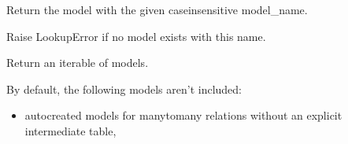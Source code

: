 \documentclass[letterpaper,10pt,english]{sphinxmanual}
\begin{document}
\begin{fulllineitems}
\begin{fulllineitems}
\end{fulllineitems}


\begin{fulllineitems}
\label{\detokenize{tasks:tasks.apps.TasksConfig.default_auto_field}}
\pysigstartsignatures
{}
\pysigstopsignatures
\end{fulllineitems}


\begin{fulllineitems}
\label{\detokenize{tasks:tasks.apps.TasksConfig.get_model}}
\pysigstartsignatures
{}
\pysigstopsignatures
\sphinxAtStartPar
Return the model with the given case\sphinxhyphen{}insensitive model\_name.

\sphinxAtStartPar
Raise LookupError if no model exists with this name.

\end{fulllineitems}


\begin{fulllineitems}
\label{\detokenize{tasks:tasks.apps.TasksConfig.get_models}}
\pysigstartsignatures
{}
\pysigstopsignatures
\sphinxAtStartPar
Return an iterable of models.

\sphinxAtStartPar
By default, the following models aren’t included:
\begin{itemize}
\item {} 
\sphinxAtStartPar
auto\sphinxhyphen{}created models for many\sphinxhyphen{}to\sphinxhyphen{}many relations without
an explicit intermediate table,


\end{itemize}
\end{fulllineitems}
\end{fulllineitems}
\end{document}

